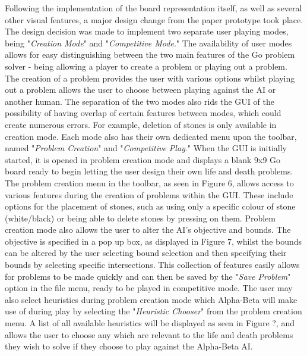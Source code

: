 \documentclass{l3proj}
\begin{document}
Following the implementation of the board representation itself, as well as several other visual features, a major design change from the paper prototype took place. The design decision was made to implement two separate user playing modes, being "\textit{Creation Mode}" and "\textit{Competitive Mode}." The availability of user modes allows for easy distinguishing between the two main features of the Go problem solver - being allowing a player to create a problem or playing out a problem. The creation of a problem provides the user with various options whilst playing out a problem allows the user to choose between playing against the AI or another human. The separation of the two modes also rids the GUI of the possibility of having overlap of certain features between modes, which could create numerous errors. For example, deletion of stones is only available in creation mode. Each mode also has their own dedicated menu upon the toolbar, named "\textit{Problem Creation}" and "\textit{Competitive Play}."
When the GUI is initially started, it is opened in problem creation mode and displays a blank 9x9 Go board ready to begin letting the user design their own life and death problems. The problem creation menu in the toolbar, as seen in Figure 6, allows access to various features during the creation of problems within the GUI. These include options for the placement of stones, such as using only a specific colour of stone (white/black) or being able to delete stones by pressing on them. Problem creation mode also allows the user to alter the AI's objective and bounds. The objective is specified in a pop up box, as displayed in Figure 7, whilst the bounds can be altered by the user selecting bound selection and then specifying their bounds by selecting specific intersections. This collection of features easily allows for problems to be made quickly and can then be saved by the "\textit{Save Problem}" option in the file menu, ready to be played in competitive mode. The user may also select heuristics during problem creation mode which Alpha-Beta will make use of during play by selecting the "\textit{Heuristic Chooser}" from the problem creation menu. A list of all available heuristics will be displayed as seen in Figure ?, and allows the user to choose any which are relevant to the life and death problems they wish to solve if they choose to play against the Alpha-Beta AI.
\end{document}

